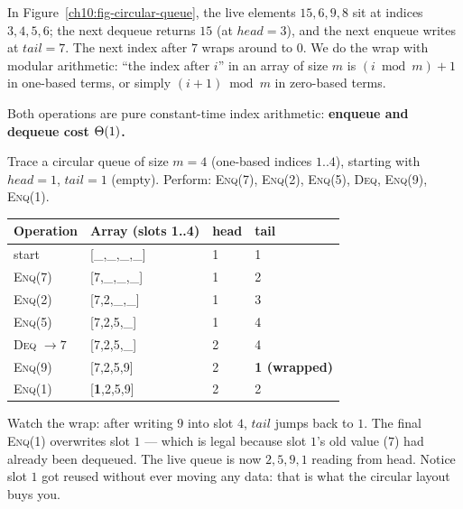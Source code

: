 In Figure~\ref{ch10:fig-circular-queue}, the live elements $15, 6, 9, 8$ sit at indices $3,4,5,6$; the next dequeue returns $15$ (at $head=3$), and the next enqueue writes at $tail=7$. The next index after $7$ wraps around to $0$. We do the wrap with modular arithmetic: ``the index after $i$'' in an array of size $m$ is $(i \bmod m) + 1$ in one-based terms, or simply $(i+1) \bmod m$ in zero-based terms.

\begin{algorithm}[H]
\caption{Queue operations on a circular array $Q[1..m]$}
\DontPrintSemicolon
{}
\BlankLine
{}
\end{algorithm}

Both operations are pure constant-time index arithmetic: \textbf{enqueue and dequeue cost $\Theta(1)$.}

\begin{labbox}
Trace a circular queue of size $m=4$ (one-based indices $1..4$), starting with $head=1$, $tail=1$ (empty). Perform: \textsc{Enq}(7), \textsc{Enq}(2), \textsc{Enq}(5), \textsc{Deq}, \textsc{Enq}(9), \textsc{Enq}(1).

\begin{center}
\begin{tabular}{llll}
\toprule
Operation & Array (slots 1..4) & head & tail \\
\midrule
start & [\_,\_,\_,\_] & 1 & 1 \\
\textsc{Enq}(7) & [7,\_,\_,\_] & 1 & 2 \\
\textsc{Enq}(2) & [7,2,\_,\_] & 1 & 3 \\
\textsc{Enq}(5) & [7,2,5,\_] & 1 & 4 \\
\textsc{Deq} $\to 7$ & [7,2,5,\_] & 2 & 4 \\
\textsc{Enq}(9) & [7,2,5,9] & 2 & \textbf{1 (wrapped)} \\
\textsc{Enq}(1) & [\textbf{1},2,5,9] & 2 & 2 \\
\bottomrule
\end{tabular}
\end{center}
Watch the wrap: after writing $9$ into slot $4$, $tail$ jumps back to $1$. The final \textsc{Enq}(1) overwrites slot $1$ --- which is legal because slot $1$'s old value ($7$) had already been dequeued. The live queue is now $2,5,9,1$ reading from head. Notice slot $1$ got reused without ever moving any data: that is what the circular layout buys you.
\end{labbox}

